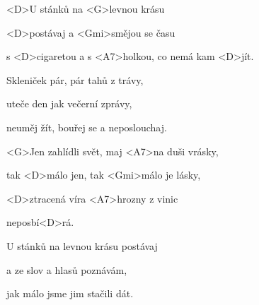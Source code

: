 

\zs
<D>U stánků na <G>levnou krásu

<D>postávaj a <Gmi>smějou se času

s <D>cigaretou a s <A7>holkou, co nemá kam <D>jít.
\ks

\zs
Skleniček pár, pár tahů z trávy,

uteče den jak večerní zprávy,

neuměj žít, bouřej se a neposlouchaj.
\ks

\zr
<G>Jen zahlídli svět, maj <A7>na duši vrásky,

tak <D>málo jen, tak <Gmi>málo je lásky,

<D>ztracená víra <A7>hrozny z vinic

neposbí<D>rá.
\kr

\zs
U stánků na levnou krásu postávaj

a ze slov a hlasů poznávám,

jak málo jsme jim stačili dát.
\ks

\zr \kr

\zr \kr

\kp







